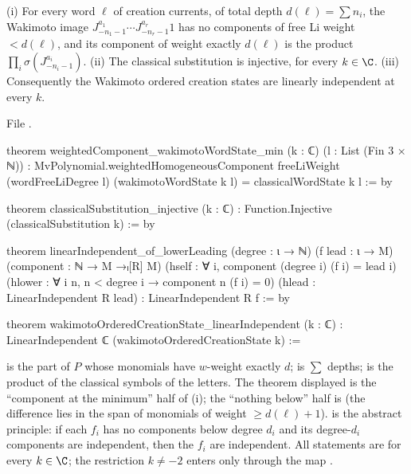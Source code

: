 \begin{theorem}\label{l08:thm:leading}
(i) For every word $\ell$ of creation currents, of total depth $d(\ell)=\sum n_i$, the Wakimoto image
$J^{a_1}_{-n_1-1}\cdots J^{a_r}_{-n_r-1}1$ has no components of free Li weight $<d(\ell)$, and its
component of weight exactly $d(\ell)$ is the product $\prod_i\sigma(J^{a_i}_{-n_i-1})$.
(ii) The classical substitution is injective, for every $k\in\C$.
(iii) Consequently the Wakimoto ordered creation states are linearly independent at every $k$.
\end{theorem}

\noindent File .
\begin{leancode}
theorem weightedComponent_wakimotoWordState_min (k : ℂ) (l : List (Fin 3 × ℕ)) :
    MvPolynomial.weightedHomogeneousComponent freeLiWeight (wordFreeLiDegree l)
        (wakimotoWordState k l) =
      classicalWordState k l := by

theorem classicalSubstitution_injective (k : ℂ) :
    Function.Injective (classicalSubstitution k) := by

theorem linearIndependent_of_lowerLeading (degree : ι → ℕ) (f lead : ι → M)
    (component : ℕ → M →ₗ[R] M)
    (hself : ∀ i, component (degree i) (f i) = lead i)
    (hlower : ∀ i n, n < degree i → component n (f i) = 0)
    (hlead : LinearIndependent R lead) : LinearIndependent R f := by

theorem wakimotoOrderedCreationState_linearIndependent (k : ℂ) :
    LinearIndependent ℂ (wakimotoOrderedCreationState k) :=
\end{leancode}

\begin{dictionary}
 is the part of $P$ whose monomials have $w$-weight exactly
$d$;  is $\sum$ depths;  is the product of the
classical symbols of the letters. The theorem displayed is the ``component at the minimum'' half of
(i); the ``nothing below'' half is \allowbreak{}\allowbreak{}\allowbreak{}\allowbreak{} (the
difference lies in the span of monomials of weight $\ge d(\ell)+1$). \allowbreak{}\allowbreak{}
is the abstract principle: if each $f_i$ has no components below degree $d_i$ and its degree-$d_i$
components are independent, then the $f_i$ are independent. All statements are for every $k\in\C$;
the restriction $k\ne-2$ enters only through the map .
\end{dictionary}

